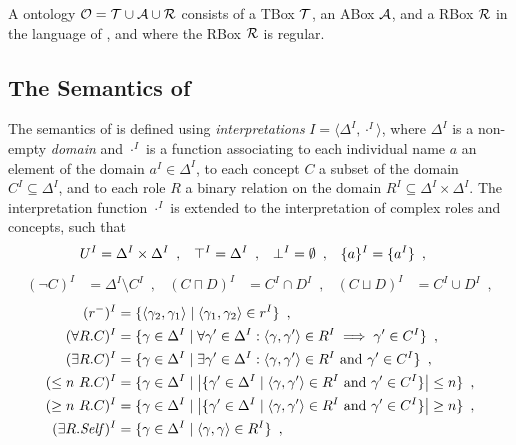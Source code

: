 
\begin{definition}
A \SROIQ  ontology $\mathcal{O} = \mathcal{T} \cup \mathcal{A} \cup \mathcal{R}$ consists of a TBox $\mathcal{T}$, an ABox $\mathcal{A}$, and a RBox $\mathcal{R}$ in the language of \SROIQ, and where the RBox $\mathcal{R}$ is regular.
\end{definition}

\subsection{The Semantics of \SROIQ} \label{sroiq-semantics}

The semantics of \SROIQ is defined using \emph{interpretations} $I = \langle \Delta^I, \cdot^I \rangle$, where $\Delta^I$ is a non-empty \emph{domain} and $\cdot^I$ is a function associating to each individual name $a$ an element of the domain $a^I \in \Delta^I$, to each concept $C$ a subset of the domain $C^I \subseteq \Delta^I$, and to each role $R$ a binary relation on the domain $R^I \subseteq \Delta^I \times \Delta^I$. The interpretation function $\cdot^I$ is extended to the interpretation of complex roles and concepts, such that
\begin{align*}
  U^I &= \Delta^I \times \Delta^I \enspace, &
  \top^I &= \Delta^I \enspace, &
  \bot^I &= \emptyset \enspace, &
  \{a\}^I &= \{ a^I \} \enspace,
\end{align*}
\vspace{-9mm}
\begin{align*}
  (\lnot C)^I &= \Delta^I \setminus C^I \enspace, &
  (C \sqcap D)^I &= C^I \cap D^I \enspace, &
  (C \sqcup D)^I &= C^I \cup D^I \enspace,
\end{align*} 
\vspace{-9mm}
\begin{align*}
  (r^-)^I &= \{ \langle \gamma_2, \gamma_1 \rangle \mid \langle \gamma_1, \gamma_2 \rangle \in r^I \} \enspace, \\
  (\forall R.C)^I &= \{ \gamma \in \Delta^I \mid \forall \gamma' \in \Delta^I : \langle \gamma, \gamma' \rangle \in R^I \implies \gamma' \in C^I \} \enspace, \\
  (\exists R.C)^I &= \{ \gamma \in \Delta^I \mid \exists \gamma' \in \Delta^I : \langle \gamma, \gamma' \rangle \in R^I \text{ and } \gamma' \in C^I \} \enspace, \\
  (\leq n~R.C)^I &= \{ \gamma \in \Delta^I \mid \left| \{ \gamma' \in \Delta^I \mid \langle \gamma, \gamma' \rangle \in R^I \text{ and } \gamma' \in C^I \} \right| \leq n \} \enspace, \\
  (\geq n~R.C)^I &= \{ \gamma \in \Delta^I \mid \left| \{ \gamma' \in \Delta^I \mid \langle \gamma, \gamma' \rangle \in R^I \text{ and } \gamma' \in C^I \} \right| \geq n \} \enspace, \\
  (\exists R.\mathit{Self})^I &= \{ \gamma \in \Delta^I \mid \langle \gamma, \gamma \rangle \in R^I \} \enspace,
\end{align*}
